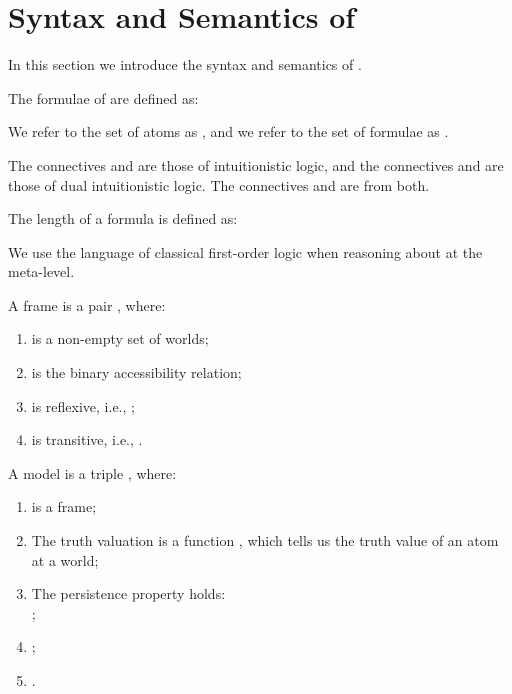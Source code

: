 \documentclass{llncs}
\numberwithin{equation}{section}
\begin{document}
\section{Syntax and Semantics of }\label{syntaxSemantics}

In this section we introduce the syntax and semantics of .

\begin{definition}[Syntax]
The formulae of  are defined as:

We refer to the set of atoms as , and we refer to the set of  formulae as .
\end{definition}

The connectives  and  are those of intuitionistic logic, and the connectives  and  are those of dual intuitionistic logic. The connectives  and  are from both.

\begin{definition}[Length]
The length of a  formula  is defined as:

\end{definition}

We use the language of classical first-order logic when reasoning about  at the meta-level.

\begin{definition}[Frame]
A  frame is a pair , where:
	\begin{enumerate}
		\item  is a non-empty set of worlds;
		\item  is the binary accessibility relation;
		\item  is reflexive, i.e.,  ;
		\item  is transitive, i.e.,  .
	\end{enumerate}
\end{definition}

\begin{definition}[Model]\label{model}
A  model is a triple , where:
	\begin{enumerate}
		\item  is a  frame;
		\item The truth valuation  is a function , which tells us the truth value of an atom at a world;
		\item The persistence property holds: \\
			;
		\item\label{top} ;
		\item\label{bottom} .
	\end{enumerate}
\end{definition}
\end{document}

